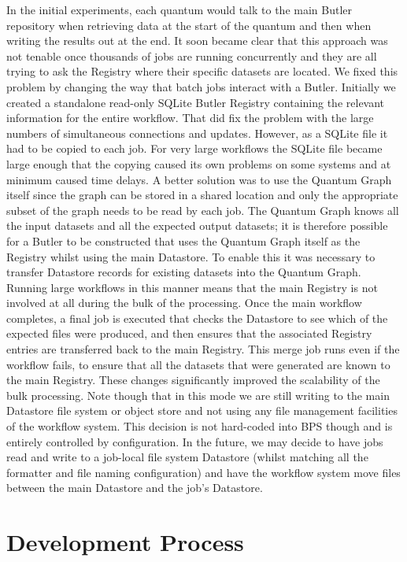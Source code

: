 \documentclass[]{spie}
\begin{document}
In the initial experiments, each quantum would talk to the main Butler repository when retrieving data at the start of the quantum and then when writing the results out at the end.
It soon became clear that this approach was not tenable once thousands of jobs are running concurrently and they are all trying to ask the Registry where their specific datasets are located.
We fixed this problem by changing the way that batch jobs interact with a Butler.
Initially we created a standalone read-only SQLite Butler Registry containing the relevant information for the entire workflow.
That did fix the problem with the large numbers of simultaneous connections and updates.
However, as a SQLite file it had to be copied to each job.
For very large workflows the SQLite file became large enough that the copying caused its own problems on some systems and at minimum caused time delays.
A better solution was to use the Quantum Graph itself since the graph can be stored in a shared location and only the appropriate subset of the graph needs to be read by each job.
The Quantum Graph knows all the input datasets and all the expected output datasets; it is therefore possible for a Butler to be constructed that uses the Quantum Graph itself as the Registry whilst using the main Datastore.
To enable this it was necessary to transfer Datastore records for existing datasets into the Quantum Graph.
Running large workflows in this manner means that the main Registry is not involved at all during the bulk of the processing.
Once the main workflow completes, a final job is executed that checks the Datastore to see which of the expected files were produced, and then ensures that the associated Registry entries are transferred back to the main Registry.
This merge job runs even if the workflow fails, to ensure that all the datasets that were generated are known to the main Registry.
These changes significantly improved the scalability of the bulk processing.
Note though that in this mode we are still writing to the main Datastore file system or object store and not using any file management facilities of the workflow system.
This decision is not hard-coded into BPS though and is entirely controlled by configuration.
In the future, we may decide to have jobs read and write to a job-local file system Datastore (whilst matching all the formatter and file naming configuration) and have the workflow system move files between the main Datastore and the job's Datastore.

\section{Development Process}
\end{document}
